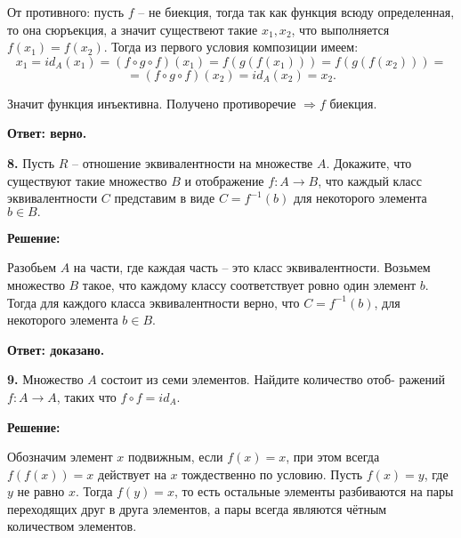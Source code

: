 \documentclass[a4paper,12pt]{article} %
\begin{document}
От противного: пусть $f$ -- не биекция, тогда так как функция всюду определенная, то она сюръекция, а значит существеют такие $x_1,x_2$, что выполняется $f(x_1) = f(x_2)$. Тогда из первого условия композиции имеем: 
\[ x_1 = id_A(x_1) = (f\circ g\circ f)(x_1) = f(g(f(x_1))) = f(g(f(x_2))) =\]
\[= (f\circ g\circ f)(x_2) = id_A(x_2) = x_2.\]

Значит функция инъективна. Получено противоречие $\Rightarrow f$ биекция.	 

\begin{flushright}
\begin{large}
\textbf {Ответ: верно.}
\end{large}
\end{flushright}

{\bf 8.} Пусть $R$ -- отношение эквивалентности на множестве $A$. Докажите,
что существуют такие множество $B$ и отображение $f : A \rightarrow B$, что
каждый класс эквивалентности $C$ представим в виде $C = f^{-1}(b)$ для некоторого элемента $b \in B.$
\begin{center}
\bfseries
{\Large Решение: }
\end{center}

Разобьем $A$ на части, где каждая часть -- это класс эквивалентности. Возьмем множество $B$ такое, что каждому классу соответствует ровно один элемент $b$. Тогда для каждого класса эквивалентности верно, что $C = f^{-1}(b)$, для некоторого элемента $b \in B.$

\begin{flushright}
\begin{large}
\textbf {Ответ: доказано.}
\end{large}
\end{flushright}

{\bf 9.} Множество $A$ состоит из семи элементов. Найдите количество отоб-
ражений $f : A \rightarrow A$, таких что $f \circ f = id_A$.
\begin{center}
\bfseries
{\Large Решение: }
\end{center}

Обозначим элемент $x$ подвижным, если $f(x)=x$, при этом всегда $f(f(x))=x$ действует на $x$ тождественно по условию. Пусть $f(x)=y$, где $y$ не равно $x$. Тогда $f(y)=x$, то есть остальные элементы разбиваются на пары переходящих друг в друга элементов, а пары всегда являются чётным количеством элементов.
\end{document}
